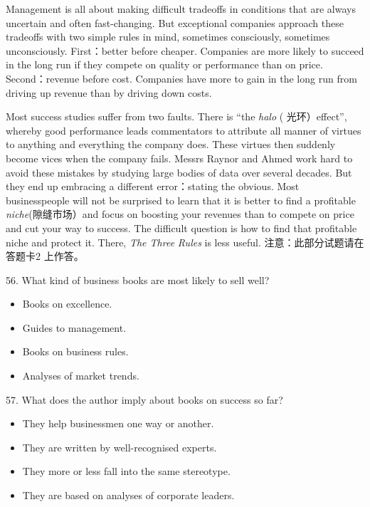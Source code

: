 \documentclass[UTF8,11pt]{ctexart}
\begin{document}
Management is all about making difficult tradeoffs in conditions that are always uncertain and often fast-changing. But exceptional companies approach these tradeoffs with two simple rules in mind, sometimes consciously, sometimes unconsciously. First：better before cheaper. Companies are more likely to succeed in the long run if they compete on quality or performance than on price. Second：revenue before cost. Companies have more to gain in the long run from driving up revenue than by driving down costs.


Most success studies suffer from two faults. There is “the\textit{ halo} ( 光环）effect”, whereby good performance leads commentators to attribute all manner of virtues to anything and everything the company does. These virtues then suddenly become vices when the company fails. Messrs Raynor and Ahmed work hard to avoid these mistakes by studying large bodies of data over several decades. But they end up embracing a different error：stating the obvious. Most businesspeople will not be surprised to learn that it is better to find a profitable\textit{ niche}(隙缝市场）and focus on boosting your revenues than to compete on price and cut your way to success. The difficult question is how to find that profitable niche and protect it. There,\textit{ The Three} \textit{Rules} is less useful. 注意：此部分试题请在答题卡2 上作答。


56. What kind of business books are most likely to sell well?


\begin{itemize}[leftmargin=2em,itemsep=.2em,topsep=.4em]\item[A.] Books on excellence.
\item[B.] Guides to management.
\item[C.] Books on business rules.
\item[D.] Analyses of market trends.
\end{itemize}

57. What does the author imply about books on success so far?


\begin{itemize}[leftmargin=2em,itemsep=.2em,topsep=.4em]\item[A.] They help businessmen one way or another.
\item[B.] They are written by well-recognised experts.
\item[C.] They more or less fall into the same stereotype.
\item[D.] They are based on analyses of corporate leaders.
\end{itemize}
\end{document}
